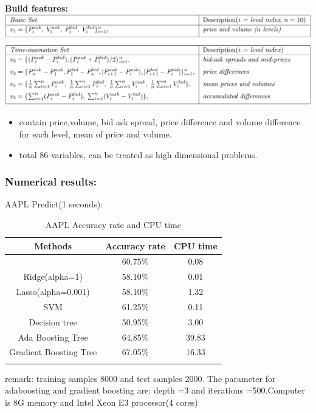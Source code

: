 \documentclass[xcolor={x11names,svgnames,dvipsnames}]{beamer}
\begin{document}
\begin{frame}
\textbf{Build features:}\\
	\includegraphics[width=1\textwidth, height=0.5\textheight]{features.png}
\begin{itemize}
			\item contain \alert{price,volume, bid ask spread, price difference and volume difference for each level, mean of price and volume.}  
            \item total 86 variables,  can be treated as high dimensional problems.
\end{itemize}
\end{frame}

\begin{frame}
\frametitle{Numerical results:}
\begin{block}{AAPL Predict(1 seconds):}
\begin{table}[h!]\small
  \caption{AAPL Accuracy rate and CPU time}
\begin{center}
    \begin{tabular}{|c|c|c|}
    \hline
    Methods& Accuracy rate& CPU time \\
    \hline\small{
Logistic&60.75\%&0.08\\
Ridge(alpha=1)&58.10\%&0.01\\
Lasso(alpha=0.001)&58.10\%&1.32\\
SVM&61.25\%&0.11\\
Decision tree&50.95\%&3.00\\
Ada Boosting Tree&64.85\%&39.83\\
Gradient Boosting Tree&67.05\%&16.33\\
}
\hline
\end{tabular}
\end{center}
\end{table}
\end{block}
\small{remark: \alert{training samples 8000 and test samples 2000}. The parameter for adaboosting and gradient boosting are: \alert{depth =3 and iterations =500}.Computer is 8G memory and Intel Xeon E3 processor(4 cores)}
\end{frame}
\end{document}

